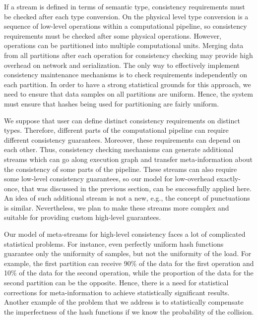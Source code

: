 If a stream is defined in terms of semantic type, consistency requirements must be checked after each type conversion. On the physical level type conversion is a sequence of low-level operations within a computational pipeline, so consistency requirements must be checked after some physical operations. However, operations can be partitioned into multiple computational units. Merging data from all partitions after each operation for consistency checking may provide high overhead on network and serialization. The only way to effectively implement consistency maintenance mechanisms is to check requirements independently on each partition. In order to have a strong statistical grounds for this approach, we need to ensure that data samples on all partitions are uniform. Hence, the system must ensure that hashes being used for partitioning are fairly uniform.

We suppose that user can define distinct consistency requirements on distinct types. Therefore, different parts of the computational pipeline can require different consistency guarantees. Moreover, these requirements can depend on each other. Thus, consistency checking mechanisms can generate additional streams which can go along execution graph and transfer meta-information about the consistency of some parts of the pipeline. These streams can also require some low-level consistency guarantees, so our model for low-overhead exactly-once, that was discussed in the previous section, can be successfully applied here. An idea of such additional stream is not a new, e.g., the concept of punctuations~\cite{Tucker:2003:EPS:776752.776780} is similar. Nevertheless, we plan to make these streams more complex and suitable for providing custom high-level guarantees.

Our model of meta-streams for high-level consistency faces a lot of complicated statistical problems. For instance, even perfectly uniform hash functions guarantee only the uniformity of samples, but not the uniformity of the load. For example, the first partition can receive 90\% of the data for the first operation and 10\% of the data for the second operation, while the proportion of the data for the second partition can be the opposite. Hence, there is a need for statistical corrections for meta-information to achieve statistically significant results. Another example of the problem that we address is to statistically compensate the imperfectness of the hash functions if we know the probability of the collision.  